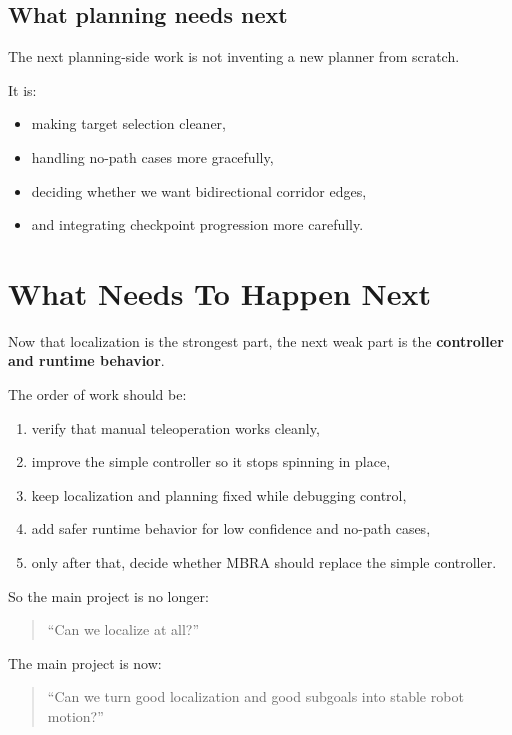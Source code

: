 \documentclass[11pt,a4paper]{article}
\begin{document}
\subsection{What planning needs next}

The next planning-side work is not inventing a new planner from scratch.

It is:

\begin{itemize}[nosep]
  \item making target selection cleaner,
  \item handling no-path cases more gracefully,
  \item deciding whether we want bidirectional corridor edges,
  \item and integrating checkpoint progression more carefully.
\end{itemize}


\section{What Needs To Happen Next}

Now that localization is the strongest part, the next weak part is the
\textbf{controller and runtime behavior}.

The order of work should be:

\begin{enumerate}[nosep]
  \item verify that manual teleoperation works cleanly,
  \item improve the simple controller so it stops spinning in place,
  \item keep localization and planning fixed while debugging control,
  \item add safer runtime behavior for low confidence and no-path cases,
  \item only after that, decide whether MBRA should replace the simple controller.
\end{enumerate}

So the main project is no longer:

\begin{quote}
``Can we localize at all?''
\end{quote}

The main project is now:

\begin{quote}
``Can we turn good localization and good subgoals into stable robot motion?''
\end{quote}
\end{document}
